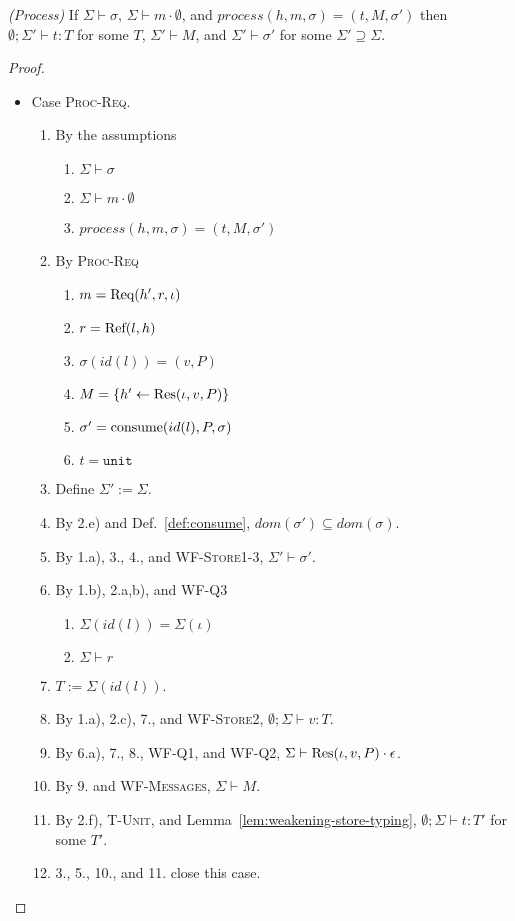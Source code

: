 \begin{lem}\emph{(Process)}\label{lem:process}
If $\Sigma \vdash \sigma$, $\Sigma \vdash m \cdot \emptyset$, and $process(h, m, \sigma) = (t, M, \sigma')$ then $\emptyset ; \Sigma' \vdash t : T$ for some $T$, $\Sigma' \vdash M$, and $\Sigma' \vdash \sigma'$ for some $\Sigma' \supseteq \Sigma$.
\end{lem}
\begin{proof}
\begin{itemize}
\item Case \textsc{Proc-Req}.
\begin{enumerate}
\item By the assumptions
  \begin{enumerate}[label=(\alph*)]
  \item $\Sigma \vdash \sigma$
  \item $\Sigma \vdash m \cdot \emptyset$
  \item $process(h, m, \sigma) = (t, M, \sigma')$
  \end{enumerate}
\item By \textsc{Proc-Req}
  \begin{enumerate}[label=(\alph*)]
  \item $m = {\textrm{Req}(h', r, \iota)}$
  \item $r = {\textrm{Ref}(l, h)}$
  \item $\sigma(id(l)) = (v, P)$
  \item $M = \{ h' \leftarrow {\textrm{Res}(\iota, v, P)} \}$
  \item $\sigma' = {\textrm{consume}(id(l), P, \sigma)}$
  \item $t = \texttt{unit}$
  \end{enumerate}
\item Define $\Sigma' := \Sigma$.
\item By 2.e) and Def.~\ref{def:consume}, $dom(\sigma') \subseteq dom(\sigma)$.
\item By 1.a), 3., 4., and \textsc{WF-Store1-3}, $\Sigma' \vdash \sigma'$.
\item By 1.b), 2.a,b), and \textsc{WF-Q3}
  \begin{enumerate}[label=(\alph*)]
  \item $\Sigma(id(l)) = \Sigma(\iota)$
  \item $\Sigma \vdash r$
  \end{enumerate}
\item $T := \Sigma(id(l))$.
\item By 1.a), 2.c), 7., and \textsc{WF-Store2}, $\emptyset ; \Sigma \vdash v : T$.
\item By 6.a), 7., 8., \textsc{WF-Q1}, and \textsc{WF-Q2}, $\Sigma \vdash {\textrm{Res}(\iota, v, P)} \cdot \epsilon$.
\item By 9. and \textsc{WF-Messages}, $\Sigma \vdash M$.
\item By 2.f), \textsc{T-Unit}, and Lemma~\ref{lem:weakening-store-typing}, $\emptyset ; \Sigma \vdash t : T'$ for some $T'$.
\item 3., 5., 10., and 11. close this case.
\end{enumerate}


\end{itemize}
\end{proof}
